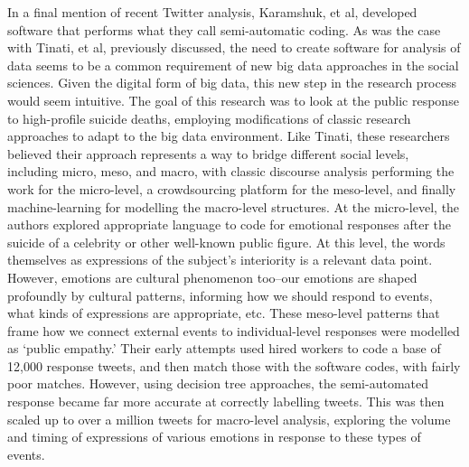 \documentclass[sigconf]{acmart}
\begin{document}
In a final mention of recent Twitter analysis, Karamshuk, et al, developed software that performs what they call semi-automatic coding. \cite{karamshuk17} As was the case with Tinati, et al, previously discussed, the need to create software for analysis of data seems to be a common requirement of new big data approaches in the social sciences.  Given the digital form of big data, this new step in the research process would seem intuitive.  The goal of this research was to look at the public response to high-profile suicide deaths, employing modifications of classic research approaches to adapt to the big data environment.  Like Tinati, these researchers believed their approach represents a way to bridge different social levels, including micro, meso, and macro, with classic discourse analysis performing the work for the micro-level, a crowdsourcing platform for the meso-level, and finally machine-learning for modelling the macro-level structures.  At the micro-level, the authors explored appropriate language to code for emotional responses after the suicide of a celebrity or other well-known public figure.  At this level, the words themselves as expressions of the subject's interiority is a relevant data point.  However, emotions are cultural phenomenon too--our emotions are shaped profoundly by cultural patterns, informing how we should respond to events, what kinds of expressions are appropriate, etc.  These meso-level patterns that frame how we connect external events to individual-level responses were modelled as `public empathy.'  Their early attempts used hired workers to code a base of 12,000 response tweets, and then match those with the software codes, with fairly poor matches.  However, using decision tree approaches, the semi-automated response became far more accurate at correctly labelling tweets.  This was then scaled up to over a million tweets for macro-level analysis, exploring the volume and timing of expressions of various emotions in response to these types of events.  \cite{karamshuk17}
\end{document}
